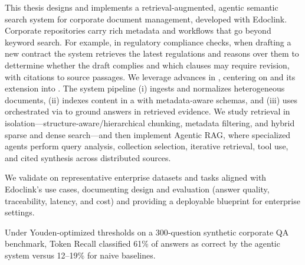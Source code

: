 \glsresetall
\noindent  
This thesis designs and implements a retrieval‑augmented, agentic semantic search system for corporate document management, developed with Edoclink. Corporate repositories carry rich metadata and workflows that go beyond keyword search. For example, in regulatory compliance checks, when drafting a new contract the system retrieves the latest regulations and reasons over them to dettermine whether the draft complies and which clauses may require revision, with citations to source passages.
We leverage advances in , centering on  and its extension into . The system pipeline (i) ingests and normalizes heterogeneous documents, (ii) indexes content in a  with metadata‑aware schemas, and (iii) uses  orchestrated via  to ground answers in retrieved evidence. We study retrieval in isolation—structure‑aware/hierarchical chunking, metadata filtering, and hybrid sparse and dense search—and then implement Agentic RAG, where specialized agents perform query analysis, collection selection, iterative retrieval, tool use, and cited synthesis across distributed sources.

We validate on representative enterprise datasets and tasks aligned with Edoclink’s use cases, documenting design and evaluation (answer quality, traceability, latency, and cost) and providing a deployable blueprint for enterprise settings.

Under Youden‑optimized thresholds on a 300‑question synthetic corporate \gls{QA} benchmark, Token Recall classified 61\% of answers as correct by the agentic system versus 12–19\% for naive baselines.





